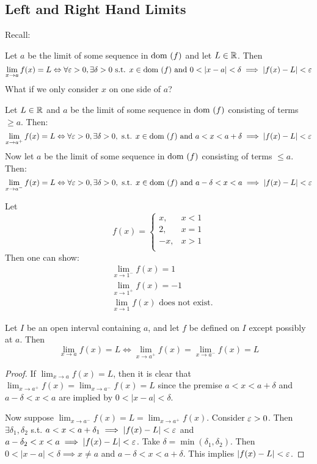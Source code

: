 \documentclass{article}
\begin{document}
\subsection{Left and Right Hand Limits}
\begin{remark}
Recall:

Let $a$ be the limit of some sequence in $\text{dom } (f)$ and let $L \in \mathbb{R}$.
Then \[
\lim_{x\to a} f(x) = L \Leftrightarrow \forall \varepsilon >0, \exists \delta >0 \text{ s.t. } x \in \text{dom }(f) \text{ and } 0 < |x-a| < \delta \implies |f(x) - L| < \varepsilon
\]
What if we only consider $x$ on one side of $a$?
\end{remark}
\begin{definition}
Let $L \in \mathbb{R}$ and $a$ be the limit of some sequence in $\text{dom } (f)$ consisting of terms $\geq a$. Then:
\[
\lim_{x\to a^+} f(x) = L \Leftrightarrow \forall \varepsilon > 0, \exists \delta > 0, \text{ s.t. } x \in \text{dom }(f) \text{ and } a < x < a + \delta \implies |f(x)- L| < \varepsilon
\]
Now let $a$ be the limit of some sequence in $\text{dom }(f)$ consisting of terms $\leq a$. Then:
\[
\lim_{x\to a^-} f(x) = L \Leftrightarrow \forall \varepsilon > 0, \exists \delta > 0, \text{ s.t. } x \in \text{dom }(f) \text{ and } a - \delta < x < a \implies |f(x)- L| < \varepsilon
\]
\end{definition}
\begin{example}
Let
\[
f(x) = \begin{cases}
    x, &x < 1\\
    2, &x = 1\\
    -x, &x > 1\\
\end{cases}
\]
Then one can show: \begin{align*}
    &\lim_{x\to 1^-} f(x) = 1\\
    &\lim_{x\to 1^+} f(x) = -1\\
    &\lim_{x\to 1} f(x) \text{ does not exist.}
\end{align*}
\end{example}
\begin{cthm}
Let $I$ be an open interval containing $a$, and let $f$ be defined on $I$ except possibly at $a$.
Then \[
\lim_{x\to a} f(x) = L \iff \lim_{x\to a^+} f(x) = \lim_{x\to a^-} f(x) = L
\]
\end{cthm}
\begin{proof}
If $\lim_{x\to a} f(x) = L$, then it is clear that $\lim_{x\to a^+} f(x) = \lim_{x\to a^-} f(x) = L$ since the premise $a < x < a + \delta$ and $a - \delta < x < a$ are implied by $0 < |x-a| < \delta$.

Now suppose $\lim_{x\to a^-} f(x) = L = \lim_{x\to a^+} f(x)$. Consider $\varepsilon > 0$. Then $\exists \delta_1, \delta_2$ s.t. $a < x < a + \delta_1 \implies |f(x) - L| < \varepsilon$ and $a-\delta_2 < x < a \implies |f(x) - L| < \varepsilon$.
Take $\delta = \min(\delta_1, \delta_2)$. Then $0 < |x-a| < \delta \implies x \neq a$ and $a - \delta < x < a + \delta$. This implies $|f(x) - L| < \varepsilon$. 
\end{proof}
\end{document}
